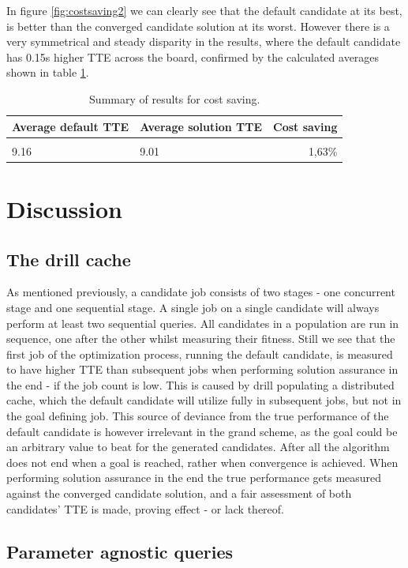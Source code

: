 \documentclass[a4paper,english]{report}
\begin{document}
	In figure \ref{fig:costsaving2} we can clearly see that the default candidate at its best, is better than the converged candidate solution at its worst. However there is a very symmetrical and steady disparity in the results, where the default candidate has 0.15s higher TTE across the board, confirmed by the calculated averages shown in table \ref{table:costsaving}.
	\begin{table}[H]
	\centering
	\caption{Summary of results for cost saving.}
	\label{table:costsaving}
	\begin{tabular}{ll|r}
		\\
		\textbf{Average default TTE} & \textbf{Average solution TTE} & \textbf{Cost saving} \\ \hline \\
		9.16 & 9.01 & 1,63\% \\
	\end{tabular}
\end{table}
	\chapter{Discussion}
	\section{The drill cache}
	\label{sec:cache}
		As mentioned previously, a candidate job consists of two stages - one concurrent stage and one sequential stage. A single job on a single candidate will always perform at least two sequential queries. All candidates in a population are run in sequence, one after the other whilst measuring their fitness. Still we see that the first job of the optimization process, running the default candidate, is measured to have higher TTE than subsequent jobs when performing solution assurance in the end - if the job count is low. This is caused by drill populating a distributed cache, which the default candidate will utilize fully in subsequent jobs, but not in the goal defining job. This source of deviance from the true performance of the default candidate is however irrelevant in the grand scheme, as the goal could be an arbitrary value to beat for the generated candidates. After all the algorithm does not end when a goal is reached, rather when convergence is achieved. When performing solution assurance in the end the true performance gets measured against the converged candidate solution, and a fair assessment of both candidates' TTE is made, proving effect - or lack thereof.
	\section{Parameter agnostic queries}
		\label{sec:param_agno}
\end{document}
